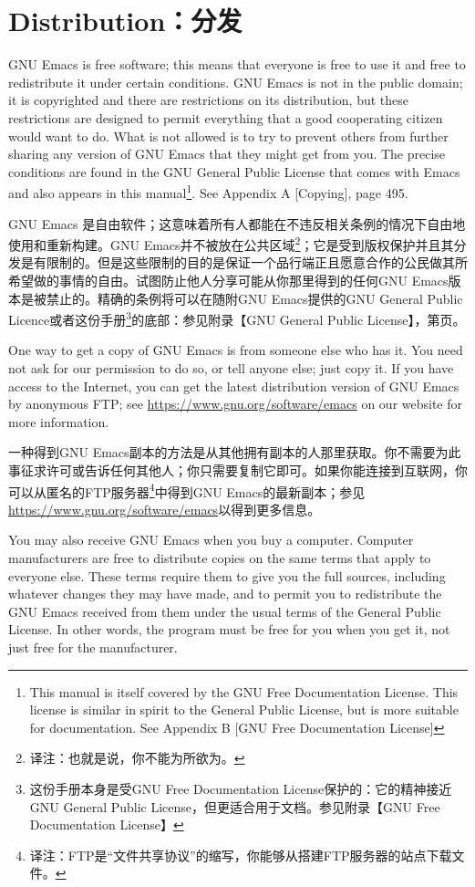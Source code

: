 \chapter{Distribution：分发}
GNU Emacs is free software; this means that everyone is free to use it and free to redistribute it under certain conditions. GNU Emacs is not in the public domain; it is copyrighted and there are restrictions on its distribution, but these restrictions are designed to permit everything that a good cooperating citizen would want to do. What is not allowed is to try to prevent others from further sharing any version of GNU Emacs that they might get from you. The precise conditions are found in the GNU General Public License that comes with Emacs and also appears in this manual\footnote{This manual is itself covered by the GNU Free Documentation License. This license is similar in spirit to the General Public License, but is more suitable for documentation. See Appendix B [GNU Free Documentation License]}. See Appendix A [Copying], page 495.\par
GNU Emacs 是自由软件；这意味着所有人都能在不违反相关条例的情况下自由地使用和重新构建。GNU Emacs并不被放在公共区域\footnote{译注：也就是说，你不能为所欲为。}；它是受到版权保护并且其分发是有限制的。但是这些限制的目的是保证一个品行端正且愿意合作的公民做其所希望做的事情的自由。试图防止他人分享可能从你那里得到的任何GNU Emacs版本是被禁止的。精确的条例将可以在随附GNU Emacs提供的GNU General Public Licence或者这份手册\footnote{这份手册本身是受GNU Free Documentation License保护的：它的精神接近GNU General Public License，但更适合用于文档。参见附录【GNU Free Documentation License】}的底部：参见附录【GNU General Public License】，第\pageref{chap:gpl}页。\par
One way to get a copy of GNU Emacs is from someone else who has it. You need not ask for our permission to do so, or tell anyone else; just copy it. If you have access to the Internet, you can get the latest distribution version of GNU Emacs by anonymous FTP; see \url{https://www.gnu.org/software/emacs} on our website for more information.\par
一种得到GNU Emacs副本的方法是从其他拥有副本的人那里获取。你不需要为此事征求许可或告诉任何其他人；你只需要复制它即可。如果你能连接到互联网，你可以从匿名的FTP服务器\footnote{译注：FTP是“文件共享协议”的缩写，你能够从搭建FTP服务器的站点下载文件。}中得到GNU Emacs的最新副本；参见\url{https://www.gnu.org/software/emacs}以得到更多信息。\par
You may also receive GNU Emacs when you buy a computer. Computer manufacturers are free to distribute copies on the same terms that apply to everyone else. These terms require them to give you the full sources, including whatever changes they may have made, and to permit you to redistribute the GNU Emacs received from them under the usual terms of the General Public License. In other words, the program must be free for you when you get it, not just free for the manufacturer.\par
